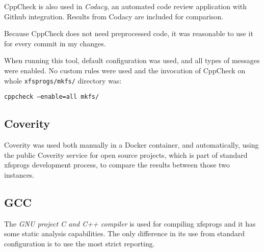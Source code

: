 CppCheck is also used in {\em Codacy}, an automated code review application
with Github integration. Results from Codacy are included for comparison.

Because CppCheck does not need preprocessed code, it was reasonable to use
it for every commit in my changes.

When running this tool, default configuration was used, and all types of
messages were enabled. No custom rules were used and the invocation of
CppCheck on whole {\tt xfsprogs/mkfs/} directory was:

{\tt cppcheck --enable=all mkfs/}



\subsection{Coverity}
Coverity was used both manually in a Docker container, and automatically,
using the public Coverity service for open source projects, which is part
of standard xfsprogs development process, to compare the results between
those two instances.

\subsection{GCC}
The {\em GNU project C and C++ compiler} is used for compiling xfsprogs and
it has some static analysis capabilities. The only difference in its use
from standard configuration is to use the most strict reporting.

